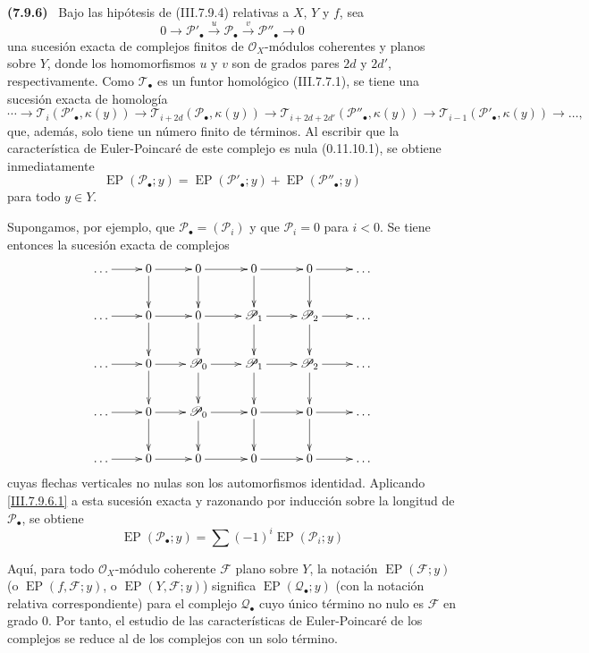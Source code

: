 \documentclass[10pt,oneside]{book}
\newcommand{\kres}{\kappa}
\newcommand{\sref}[2][]{\textup{(#2)}}
\newcommand{\oldpage}[2][]{\setcounter{footnote}{0}\marginpar{\scriptsize\textbf{#1}~|~#2}\ignorespaces}
\newenvironment{env}[1][]{\par\medskip\noindent\textbf{(#1)}\ }{\par}
\providecommand{\setmin}{-}%
\begin{document}
\begin{env}[7.9.6]
\label{III.7.9.6}
Bajo las hipótesis de \sref{III.7.9.4} relativas a
$X$, $Y$ y $f$, sea
\[
  0\longrightarrow\mathscr P'_\bullet
    \xrightarrow{u}\mathscr P_\bullet
    \xrightarrow{v}\mathscr P''_\bullet
    \longrightarrow 0
\]
una sucesión exacta de complejos finitos de $\mathscr O_X$-módulos
coherentes y planos sobre $Y$, donde los homomorfismos $u$ y $v$
son de grados pares $2d$ y $2d'$, respectivamente.
Como $\mathscr T_\bullet$ es un funtor homológico
\sref{III.7.7.1}, se tiene una sucesión exacta de homología
\[
  \cdots\longrightarrow
  \mathscr T_i(\mathscr P'_\bullet,\kres(y))
  \longrightarrow
  \mathscr T_{i+2d}(\mathscr P_\bullet,\kres(y))
  \longrightarrow
  \mathscr T_{i+2d+2d'}(\mathscr P''_\bullet,\kres(y))
  \longrightarrow
  \mathscr T_{i-1}(\mathscr P'_\bullet,\kres(y))
  \longrightarrow\ldots ,
\]
que, además, solo tiene un número finito de términos. Al escribir
que la característica de Euler-Poincaré de este complejo es nula
\sref[0]{0.11.10.1}, se obtiene inmediatamente
\[
  \operatorname{EP}(\mathscr P_\bullet;y)
  =
  \operatorname{EP}(\mathscr P'_\bullet;y)
  +
  \operatorname{EP}(\mathscr P''_\bullet;y)
  \tag{7.9.6.1}\label{III.7.9.6.1}
\]
para todo $y\in Y$.

Supongamos, por ejemplo, que
$\mathscr P_\bullet=(\mathscr P_i)$ y que $\mathscr P_i=0$ para
$i<0$. Se tiene entonces la sucesión exacta de complejos
\[
\xymatrix@C=2.4em{
  \ldots \ar[r] & 0 \ar[r]\ar[d] & 0 \ar[r]\ar[d]
    & 0 \ar[r]\ar[d] & 0 \ar[r]\ar[d] & \ldots \\
  \ldots \ar[r] & 0 \ar[r]\ar[d] & 0 \ar[r]\ar[d]
    & \mathscr P_1 \ar[r]\ar[d] & \mathscr P_2 \ar[r]\ar[d] & \ldots \\
  \ldots \ar[r] & 0 \ar[r]\ar[d] & \mathscr P_0 \ar[r]\ar[d]
    & \mathscr P_1 \ar[r]\ar[d] & \mathscr P_2 \ar[r]\ar[d] & \ldots \\
  \ldots \ar[r] & 0 \ar[r]\ar[d] & \mathscr P_0 \ar[r]\ar[d]
    & 0 \ar[r]\ar[d] & 0 \ar[r]\ar[d] & \ldots \\
  \ldots \ar[r] & 0 \ar[r] & 0 \ar[r]
    & 0 \ar[r] & 0 \ar[r] & \ldots
}
\]
cuyas flechas verticales no nulas son los automorfismos identidad.
Aplicando \eqref{III.7.9.6.1} a esta sucesión exacta y razonando por
inducción sobre la longitud de $\mathscr P_\bullet$, se obtiene
\[
  \operatorname{EP}(\mathscr P_\bullet;y)
  =
  \sum(\setmin 1)^i\operatorname{EP}(\mathscr P_i;y)
  \tag{7.9.6.2}\label{III.7.9.6.2}
\]

\oldpage[III]{210}
Aquí, para todo $\mathscr O_X$-módulo coherente $\mathscr F$ plano
sobre $Y$, la notación $\operatorname{EP}(\mathscr F;y)$ (o
$\operatorname{EP}(f,\mathscr F;y)$, o
$\operatorname{EP}(Y,\mathscr F;y)$) significa
$\operatorname{EP}(\mathscr Q_\bullet;y)$ (con la notación relativa
correspondiente) para el complejo $\mathscr Q_\bullet$ cuyo único
término no nulo es $\mathscr F$ en grado $0$. Por tanto, el estudio
de las características de Euler-Poincaré de los complejos se reduce
al de los complejos con un solo término.
\end{env}
\end{document}
